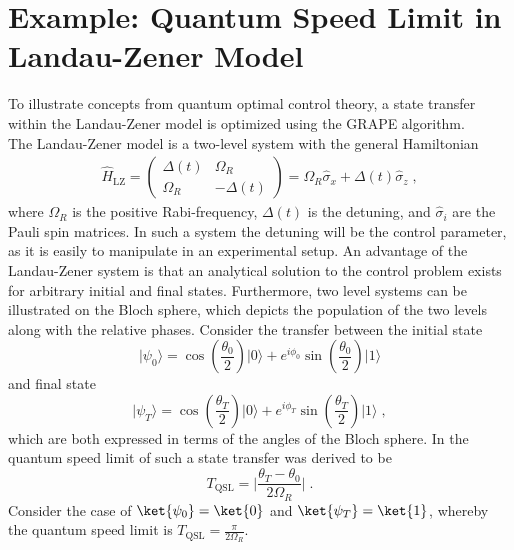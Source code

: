 \chapter{Example: Quantum Speed Limit in Landau-Zener Model} \label{chap:LZexample}
To illustrate concepts from quantum optimal control theory, a state transfer within the Landau-Zener model is optimized using the GRAPE algorithm.\\
The Landau-Zener model is a two-level system with the general Hamiltonian
\begin{align}
	\hat{H}_{\mathrm{LZ}} = \begin{pmatrix}
    	 \Delta (t) & \Omega_R    \\
         \Omega_R & -\Delta (t) 		
    \end{pmatrix}  = \Omega_R \hat{\sigma}_x + \Delta (t) \hat{\sigma}_z \; , \label{eq:LZhamiltonian}
\end{align}
where $\Omega_R$ is the positive Rabi-frequency, $\Delta (t)$ is the detuning, and $\hat{\sigma}_i$ are the Pauli spin matrices. In such a system the detuning will be the control parameter, as it is easily to manipulate in an experimental setup. An advantage of the Landau-Zener system is that an analytical solution to the control problem exists for arbitrary initial and final states. Furthermore, two level systems can be illustrated on the Bloch sphere, which depicts the population of the two levels along with the relative phases. Consider the transfer between the initial state
\begin{equation}
\lvert \psi_0 \rangle = \cos{\left(\frac{\theta_0}{2}\right)} \lvert 0 \rangle + e^{i\phi_0}\sin{\left(\frac{\theta_0}{2}\right)}\lvert 1 \rangle 
\end{equation}
and final state
\begin{equation}
\lvert \psi_T \rangle = \cos{\left(\frac{\theta_T}{2}\right)} \lvert 0 \rangle + e^{i\phi_T}\sin{\left(\frac{\theta_T}{2}\right)}\lvert 1 \rangle \; ,
\end{equation}
which are both expressed in terms of the angles of the Bloch sphere.
In \cite{QOCTtwolevel} the quantum speed limit of such a state transfer was derived to be 
\begin{equation}
	T_{\mathrm{QSL}} = \lvert \frac{\theta_T - \theta_0}{2 \Omega_R} \rvert \; . 
\end{equation}
Consider the case of $\ket{\psi_0} = \ket{0}$ and $\ket{\psi_T} = \ket{1}$, whereby the quantum speed limit is $T_{\mathrm{QSL}} = \frac{\pi}{2 \Omega_R}$. 

